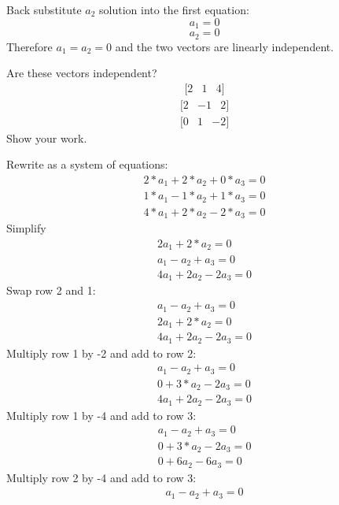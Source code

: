 Back substitute $a_2$ solution into the first equation:
$$a_1  = 0$$
$$a_2 = 0$$ 
Therefore $a_1 = a_2 = 0$ and the two vectors are linearly independent.

\begin{Exercise}[title={Vector Independence}, label=vector_independence]
    Are these vectors independent? 
$$\begin{matrix}[2 & 1  & 4]\end{matrix}$$
$$\begin{matrix}[2  & -1  & 2]\end{matrix}$$ 
$$\begin{matrix}[0  & 1  & -2]\end{matrix}$$
Show your work.
\end{Exercise}

\begin{Answer}[ref=vector_independence]
    Rewrite as a system of equations:
        $$\begin{matrix}
			2*a_1 +2*a_2 + 0*a_3 = 0 \\
			1*a_1 - 1*a_2 + 1*a_3 = 0 \\
			4*a_1 + 2*a_2 - 2*a_3 = 0
		  \end{matrix} $$
	Simplify
		$$\begin{matrix}
			2a_1 +2*a_2 = 0 \\
			a_1 - a_2 + a_3 = 0 \\
			4a_1 + 2a_2 - 2a_3 = 0
		  \end{matrix} $$
	Swap row 2 and 1:
		$$\begin{matrix}
			a_1 - a_2 + a_3 = 0 \\
			2a_1 + 2*a_2 = 0 \\
			4a_1 + 2a_2 - 2a_3 = 0
		  \end{matrix} $$
	Multiply row 1 by -2 and add to row 2:
	   $$\begin{matrix}
			a_1 - a_2 + a_3 = 0 \\
			0 +  3*a_2 - 2a_3  = 0 \\
			4a_1 + 2a_2 - 2a_3 = 0
		  \end{matrix} $$
	Multiply row 1 by -4 and add to row 3:	
	    $$\begin{matrix}
			a_1 - a_2 + a_3 = 0 \\
			0 + 3*a_2 -2a_3 = 0 \\
			0 + 6a_2 - 6a_3 = 0
		  \end{matrix} $$
	Multiply row 2 by -4 and add to row 3:
	   $$\begin{matrix}
			a_1 - a_2 + a_3 = 0 \\

\end{matrix}$$
\end{Answer}
